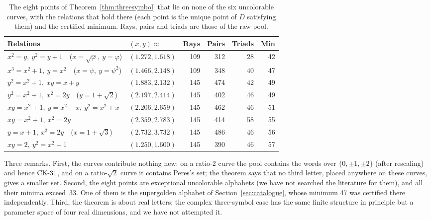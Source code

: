 \begin{table}[t]
\centering
\caption{The eight points of Theorem~\ref{thm:threesymbol} that lie on none of the six
uncolorable curves, with the relations that hold there (each point is the unique point of $D$
satisfying them) and the certified minimum.  Rays, pairs and triads are those of the raw pool.}
\label{tab:threesymbol}
\small
\begin{tabular}{@{}llrrrr@{}}
\toprule
Relations & $(x,y)\approx$ & Rays & Pairs & Triads & Min \\
\midrule
$x^2=y,\ y^2=y+1$\ \ ($x=\sqrt\varphi,\ y=\varphi$) & $(1.272,1.618)$ & 109 & 312 & 28 & 42 \\
$x^3=x^2+1,\ y=x^2$\ \ ($x=\psi,\ y=\psi^2$) & $(1.466,2.148)$ & 109 & 348 & 40 & 47 \\
$y^2=x^2+1,\ xy=x+y$ & $(1.883,2.132)$ & 145 & 474 & 42 & 49 \\
$y^2=x^2+1,\ x^2=2y$\ \ ($y=1+\sqrt2$) & $(2.197,2.414)$ & 145 & 402 & 46 & 49 \\
$xy=x^2+1,\ y=x^2-x,\ y^2=x^2+x$ & $(2.206,2.659)$ & 145 & 462 & 46 & 51 \\
$xy=x^2+1,\ x^2=2y$ & $(2.359,2.783)$ & 145 & 414 & 58 & 55 \\
$y=x+1,\ x^2=2y$\ \ ($x=1+\sqrt3$) & $(2.732,3.732)$ & 145 & 486 & 46 & 56 \\
$xy=2,\ y^2=x^2+1$ & $(1.250,1.600)$ & 145 & 390 & 46 & 57 \\
\bottomrule
\end{tabular}
\end{table}

Three remarks.  First, the curves contribute nothing new: on a ratio-2 curve the pool contains
the words over $\{0,\pm1,\pm2\}$ (after rescaling) and hence $\mathrm{CK}\text{-}31$, and on a ratio-$\sqrt2$ curve
it contains Peres's set; the theorem says that no third letter, placed anywhere on these curves,
gives a smaller set.  Second, the eight points are exceptional uncolorable alphabets (we have
not searched the literature for them), and all their minima exceed~33.  One of them is the supergolden alphabet of Section~\ref{sec:catalogue}, whose
minimum 47 was certified there independently.  Third, the theorem is about real letters; the
complex three-symbol case has the same finite structure in principle but a parameter space of four
real dimensions, and we have not attempted it.

